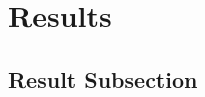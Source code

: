 \setcounter{figure}{0}
\setcounter{table}{0}
\section{Results}
\lipsum[1-4]    

\subsection{Result Subsection}
\lipsum[5-8]  